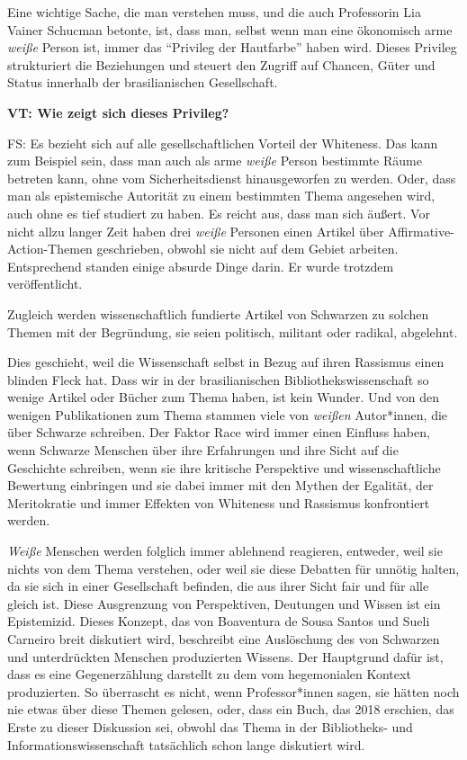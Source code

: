 \documentclass[a4paper,
fontsize=11pt,
oneside,
numbers=noperiodatend,
parskip=half-,
bibliography=totoc,
final
]{scrartcl}
\begin{document}
Eine wichtige Sache, die man verstehen muss, und die auch Professorin
Lia Vainer Schucman betonte, ist, dass man, selbst wenn man eine
ökonomisch arme \emph{weiße} Person ist, immer das \enquote{Privileg der
Hautfarbe} haben wird. Dieses Privileg strukturiert die Beziehungen und
steuert den Zugriff auf Chancen, Güter und Status innerhalb der
brasilianischen Gesellschaft.

\textbf{VT: Wie zeigt sich dieses Privileg?}

FS: Es bezieht sich auf alle gesellschaftlichen Vorteil der Whiteness.
Das kann zum Beispiel sein, dass man auch als arme \emph{weiße} Person
bestimmte Räume betreten kann, ohne vom Sicherheitsdienst hinausgeworfen
zu werden. Oder, dass man als epistemische Autorität zu einem bestimmten
Thema angesehen wird, auch ohne es tief studiert zu haben. Es reicht
aus, dass man sich äußert. Vor nicht allzu langer Zeit haben drei
\emph{weiße} Personen einen Artikel über Affirmative-Action-Themen
geschrieben, obwohl sie nicht auf dem Gebiet arbeiten. Entsprechend
standen einige absurde Dinge darin. Er wurde trotzdem veröffentlicht.

Zugleich werden wissenschaftlich fundierte Artikel von Schwarzen zu
solchen Themen mit der Begründung, sie seien politisch, militant oder
radikal, abgelehnt.

Dies geschieht, weil die Wissenschaft selbst in Bezug auf ihren
Rassismus einen blinden Fleck hat. Dass wir in der brasilianischen
Bibliothekswissenschaft so wenige Artikel oder Bücher zum Thema haben,
ist kein Wunder. Und von den wenigen Publikationen zum Thema stammen
viele von \emph{weißen} Autor*innen, die über Schwarze schreiben. Der
Faktor Race wird immer einen Einfluss haben, wenn Schwarze Menschen über
ihre Erfahrungen und ihre Sicht auf die Geschichte schreiben, wenn sie
ihre kritische Perspektive und wissenschaftliche Bewertung einbringen
und sie dabei immer mit den Mythen der Egalität, der Meritokratie und
immer Effekten von Whiteness und Rassismus konfrontiert werden.

\emph{Weiße} Menschen werden folglich immer ablehnend reagieren,
entweder, weil sie nichts von dem Thema verstehen, oder weil sie diese
Debatten für unnötig halten, da sie sich in einer Gesellschaft befinden,
die aus ihrer Sicht fair und für alle gleich ist. Diese Ausgrenzung von
Perspektiven, Deutungen und Wissen ist ein Epistemizid. Dieses Konzept,
das von Boaventura de Sousa Santos und Sueli Carneiro breit diskutiert
wird, beschreibt eine Auslöschung des von Schwarzen und unterdrückten
Menschen produzierten Wissens. Der Hauptgrund dafür ist, dass es eine
Gegenerzählung darstellt zu dem vom hegemonialen Kontext produzierten.
So überrascht es nicht, wenn Professor*innen sagen, sie hätten noch nie
etwas über diese Themen gelesen, oder, dass ein Buch, das 2018 erschien,
das Erste zu dieser Diskussion sei, obwohl das Thema in der Bibliotheks-
und Informationswissenschaft tatsächlich schon lange diskutiert wird.
\end{document}
